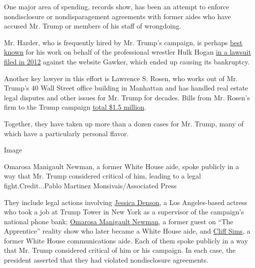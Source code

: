 One major area of spending, records show, has been an attempt to enforce
nondisclosure or nondisparagement agreements with former aides who have
accused Mr. Trump or members of his staff of wrongdoing.

Mr. Harder, who is frequently hired by Mr. Trump's campaign, is perhaps
\href{https://www.nytimes3xbfgragh.onion/2016/05/30/business/media/gawker-case-calls-attention-to-a-go-to-hollywood-lawyer.html}{best
known} for his work on behalf of the professional wrestler Hulk Hogan
\href{https://www.nytimes3xbfgragh.onion/2016/03/19/business/media/gawker-hulk-hogan-verdict.html}{in
a lawsuit filed in 2012} against the website Gawker, which ended up
causing its bankruptcy.

Another key lawyer in this effort is Lawrence S. Rosen, who works out of
Mr. Trump's 40 Wall Street office building in Manhattan and has handled
real estate legal disputes and other issues for Mr. Trump for decades.
Bills from Mr. Rosen's firm to the Trump campaign
\href{https://www.fec.gov/data/disbursements/?data_type=processed\&committee_id=C00580100\&recipient_name=hornik+rosen\&two_year_transaction_period=2020\&two_year_transaction_period=2018\&two_year_transaction_period=2016}{total
\$1.5 million}.

Together, they have taken up more than a dozen cases for Mr. Trump, many
of which have a particularly personal flavor.

Image

Omarosa Manigault Newman, a former White House aide, spoke publicly in a
way that Mr. Trump considered critical of him, leading to a legal
fight.Credit...Pablo Martinez Monsivais/Associated Press

They include legal actions involving
\href{https://int.graylady3jvrrxbe.onion/data/documenttools/101616-2017-jessica-denson-v-jessica-denson-exhibit-s-17-arbitration-files/b5ecf44c5ac0c015/full.pdf}{Jessica
Denson}, a Los Angeles-based actress who took a job at Trump Tower in
New York as a supervisor of the campaign's national phone bank;
\href{https://int.graylady3jvrrxbe.onion/data/documenttools/trump-v-omarosa-arbitration-claim/19adad0d6fe57d07/full.pdf}{Omarosa
Manigault Newman}, a former guest on ``The Apprentice'' reality show who
later became a White House aide, and
\href{https://int.graylady3jvrrxbe.onion/data/documenttools/2019-02-sims-complaint2-11/5897bc7416fcc0ad/full.pdf}{Cliff
Sims}, a former White House communications aide. Each of them spoke
publicly in a way that Mr. Trump considered critical of him or his
campaign. In each case, the president asserted that they had violated
nondisclosure agreements.

